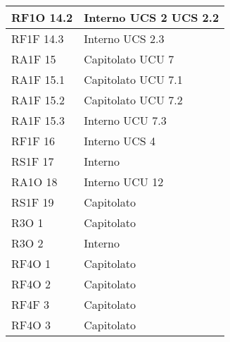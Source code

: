 \begin{center}
\begin{longtable}{ | p{5cm} | p{5cm} |}
        RF1O 14.2 &  Interno \newline  UCS 2 \newline  UCS 2.2 \newline  \\ \hline      
        RF1F 14.3 &  Interno \newline  UCS 2.3 \newline  \\ \hline      
        RA1F 15 &  Capitolato \newline  UCU 7 \newline  \\ \hline      
        RA1F 15.1 &  Capitolato \newline  UCU 7.1 \newline  \\ \hline      
        RA1F 15.2 &  Capitolato \newline  UCU 7.2 \newline  \\ \hline      
        RA1F 15.3 &  Interno \newline  UCU 7.3 \newline  \\ \hline      
        RF1F 16 &  Interno \newline  UCS 4 \newline  \\ \hline      
        RS1F 17 &  Interno \newline  \\ \hline      
        RA1O 18 &  Interno \newline  UCU 12 \newline  \\ \hline      
        RS1F 19 &  Capitolato \newline  \\ \hline      
        R3O 1 &  Capitolato \newline  \\ \hline      
        R3O 2 &  Interno \newline  \\ \hline      
        RF4O 1 &  Capitolato \newline  \\ \hline      
        RF4O 2 &  Capitolato \newline  \\ \hline      
        RF4F 3 &  Capitolato \newline  \\ \hline      
        RF4O 3 &  Capitolato \newline  \\ \hline      

\end{longtable}
\end{center}
